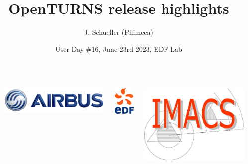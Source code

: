 \documentclass[aspectratio=169]{beamer}
\title[OpenTURNS]{OpenTURNS release highlights}
\author[OpenTURNS et al.]{J. Schueller (Phimeca)}
\date[]{User Day \#16, June 23rd 2023, EDF Lab}
\begin{document}

  \begin{frame}
  \titlepage

  \begin{columns}
  \begin{column}[t]{0.05\textwidth}
        \end{column}
  
  \begin{center}
\includegraphics[height=0.04\textheight]{figures/airbus-logo-3d-blue.png}
\end{center}

  \begin{center}
\includegraphics[height=0.09\textheight]{figures/logo-edf.jpg}
\end{center}

  \begin{center}
\includegraphics[height=0.09\textheight]{figures/imacs-logo.jpg}
\end{center}


\end{columns}
\end{frame}
\end{document}
